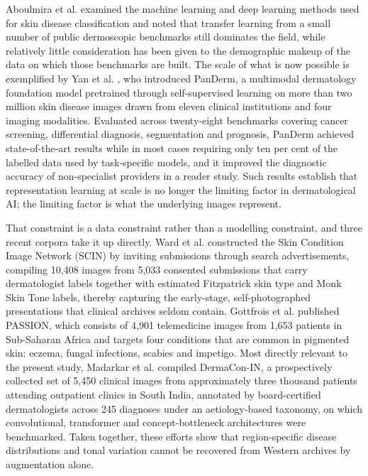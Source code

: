 \documentclass[pdflatex,sn-mathphys-num]{sn-jnl}%
\begin{document}
Aboulmira et al. \cite{ref1} examined the machine learning and deep learning methods used
for skin disease classification and noted that transfer learning from a small number of
public dermoscopic benchmarks still dominates the field, while relatively little
consideration has been given to the demographic makeup of the data on which those
benchmarks are built. The scale of what is now possible is exemplified by Yan et al.
\cite{ref2}, who introduced PanDerm, a multimodal dermatology foundation model pretrained
through self-supervised learning on more than two million skin disease images drawn from
eleven clinical institutions and four imaging modalities. Evaluated across twenty-eight
benchmarks covering cancer screening, differential diagnosis, segmentation and prognosis,
PanDerm achieved state-of-the-art results while in most cases requiring only ten per cent
of the labelled data used by task-specific models, and it improved the diagnostic accuracy
of non-specialist providers in a reader study. Such results establish that representation
learning at scale is no longer the limiting factor in dermatological AI; the limiting factor
is what the underlying images represent.

That constraint is a data constraint rather than a modelling constraint, and three recent
corpora take it up directly. Ward et al. \cite{ref3} constructed the Skin Condition Image
Network (SCIN) by inviting submissions through search advertisements, compiling 10,408
images from 5,033 consented submissions that carry dermatologist labels together with
estimated Fitzpatrick skin type and Monk Skin Tone labels, thereby capturing the
early-stage, self-photographed presentations that clinical archives seldom contain.
Gottfrois et al. \cite{ref4} published PASSION, which consists of 4,901 telemedicine images
from 1,653 patients in Sub-Saharan Africa and targets four conditions that are common in
pigmented skin: eczema, fungal infections, scabies and impetigo. Most directly relevant to
the present study, Madarkar et al. \cite{ref5} compiled DermaCon-IN, a prospectively
collected set of 5,450 clinical images from approximately three thousand patients attending
outpatient clinics in South India, annotated by board-certified dermatologists across 245
diagnoses under an aetiology-based taxonomy, on which convolutional, transformer and
concept-bottleneck architectures were benchmarked. Taken together, these efforts show that
region-specific disease distributions and tonal variation cannot be recovered from Western
archives by augmentation alone.
\end{document}
